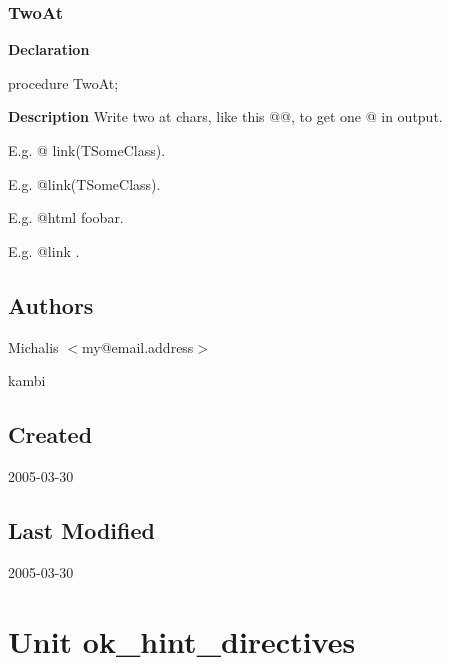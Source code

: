 \documentclass{report}
\newif\ifpdf
\begin{document}
\subsection*{TwoAt}
\fi
\label{ok_expanding_descriptions-TwoAt}
\begin{list}{}{
\setlength{\itemindent}{0cm}
\setlength{\listparindent}{0cm}
\setlength{\leftmargin}{\evensidemargin}
\addtolength{\leftmargin}{\tmplength}
\settowidth{\labelsep}{X}
\addtolength{\leftmargin}{\labelsep}
\setlength{\labelwidth}{\tmplength}
}
\item[\textbf{Declaration}\hfill]
\ifpdf
\begin{flushleft}
\fi
\begin{ttfamily}
procedure TwoAt;\end{ttfamily}

\ifpdf
\end{flushleft}
\fi

\par
\item[\textbf{Description}]
Write two at chars, like this @@, to get one @ in output.

E.g. @ link(TSomeClass).

E.g. @link(TSomeClass).

E.g. @html foobar.

E.g. @link .

\end{list}
\section{Authors}
\par
Michalis {$<$}my@email.address{$>$}

\par
kambi

\section{Created}
\par
2005{-}03{-}30


\section{Last Modified}
\par
2005{-}03{-}30


\chapter{Unit ok{\_}hint{\_}directives}
\label{ok_hint_directives}
\end{document}
